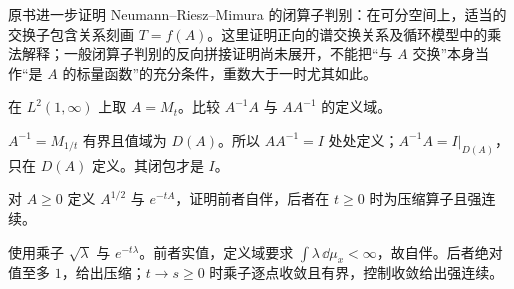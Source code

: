 原书进一步证明 Neumann--Riesz--Mimura 的闭算子判别：在可分空间上，适当的交换子包含关系刻画 $T=f(A)$。这里证明正向的谱交换关系及循环模型中的乘法解释；一般闭算子判别的反向拼接证明尚未展开，不能把“与 $A$ 交换”本身当作“是 $A$ 的标量函数”的充分条件，重数大于一时尤其如此。

\begin{exercise}[定义域使恒等式失效]\label{ex:y11-product-domain}
在 $L^2(1,\infty)$ 上取 $A=M_t$。比较 $A^{-1}A$ 与 $AA^{-1}$ 的定义域。
\end{exercise}
\begin{solution}
$A^{-1}=M_{1/t}$ 有界且值域为 $D(A)$。所以 $AA^{-1}=I$ 处处定义；$A^{-1}A=I|_{D(A)}$，只在 $D(A)$ 定义。其闭包才是 $I$。
\end{solution}

\begin{exercise}[实函数与复函数]\label{ex:y11-functional-examples}
对 $A\ge0$ 定义 $A^{1/2}$ 与 $e^{-tA}$，证明前者自伴，后者在 $t\ge0$ 时为压缩算子且强连续。
\end{exercise}
\begin{solution}
使用乘子 $\sqrt\lambda$ 与 $e^{-t\lambda}$。前者实值，定义域要求 $\int\lambda\,\dd\mu_x<\infty$，故自伴。后者绝对值至多 $1$，给出压缩；$t\to s\ge0$ 时乘子逐点收敛且有界，控制收敛给出强连续。
\end{solution}
